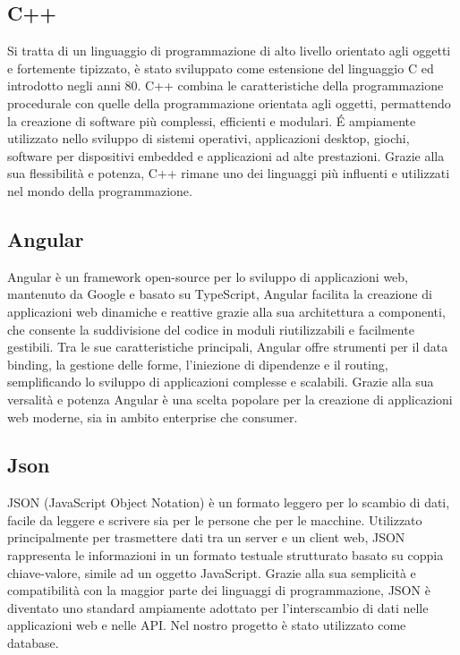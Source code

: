 \documentclass[a4paper, 11pt,oneside]{book}
\begin{document}
        \subsection{C++}
            Si tratta di un linguaggio di programmazione di alto livello orientato agli oggetti e fortemente tipizzato, è stato sviluppato come estensione del linguaggio C ed introdotto negli anni 80.
            C++ combina le caratteristiche della programmazione procedurale con quelle della programmazione orientata agli oggetti, permattendo la creazione di software più complessi, efficienti e modulari.
            \'E ampiamente utilizzato nello sviluppo di sistemi operativi, applicazioni desktop, giochi, software per dispositivi embedded e applicazioni ad alte prestazioni. Grazie alla sua flessibilità e potenza, C++ rimane
            uno dei linguaggi più influenti e utilizzati nel mondo della programmazione.
        \subsection{Angular}
            Angular è un framework open-source per lo sviluppo di applicazioni web, mantenuto da Google e basato su TypeScript, Angular facilita la creazione di applicazioni web dinamiche e reattive grazie alla sua architettura
            a componenti, che consente la suddivisione del codice in moduli riutilizzabili e facilmente gestibili. Tra le sue caratteristiche principali, Angular offre strumenti per il data binding, la gestione delle forme, l'iniezione
            di dipendenze e il routing, semplificando lo sviluppo di applicazioni complesse e scalabili. Grazie alla sua versalità e potenza Angular è una scelta popolare per la creazione di applicazioni web moderne, sia in ambito 
            enterprise che consumer.
        \subsection{Json}
            JSON (JavaScript Object Notation) è un formato leggero per lo scambio di dati, facile da leggere e scrivere sia per le persone che per le macchine. Utilizzato principalmente per trasmettere dati tra un server e un client web, JSON
            rappresenta le informazioni in un formato testuale strutturato basato su coppia chiave-valore, simile ad un oggetto JavaScript. Grazie alla sua semplicità e compatibilità con la maggior parte dei linguaggi di programmazione, JSON è
            diventato uno standard ampiamente adottato per l'interscambio di dati nelle applicazioni web e nelle API. Nel nostro progetto è stato utilizzato come database.
\end{document}
